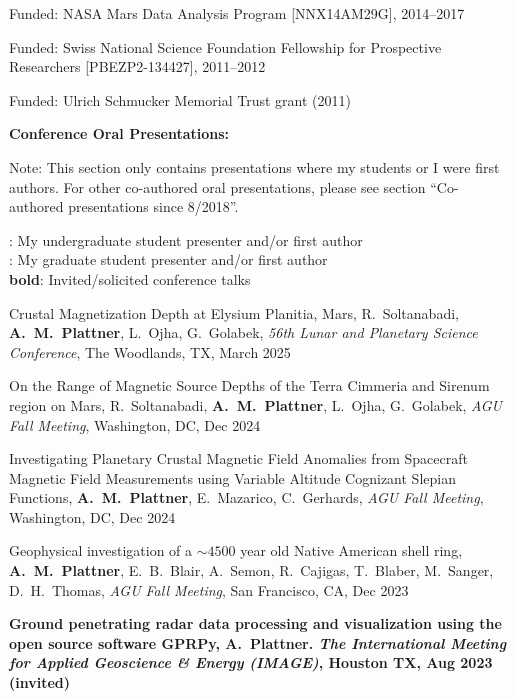 \documentclass[10pt]{article}
\begin{document}
 \spcp 
Funded: NASA Mars Data Analysis Program [NNX14AM29G], 2014--2017

\spcp Funded: Swiss National Science Foundation Fellowship for Prospective Researchers
[PBEZP2-134427], 2011--2012

\spcp
Funded: Ulrich Schmucker Memorial Trust grant (2011)


\spc
\textbf{\tsize Conference Oral Presentations:}

\vspace{0.2cm}
Note: This section only contains presentations where my students or I were first authors. For other co-authored oral presentations, please see section ``Co-authored presentations since 8/2018''.

\spcp
\ug: My undergraduate student presenter and/or first author\\
\gr: My graduate student presenter and/or first author\\
\textbf{bold}: Invited/solicited conference talks

\spcp
\hspace{-0.4cm} \gr \hspace{-0.03cm} Crustal Magnetization
Depth at Elysium Planitia, Mars, R.\ Soltanabadi, \textbf{A.~M.~Plattner},
L.\ Ojha, G.\ Golabek, \emph{56th Lunar and Planetary Science Conference},
The Woodlands, TX, March 2025

\spcp
\hspace{-0.4cm} \gr \hspace{-0.03cm} On the Range of Magnetic Source Depths of the Terra Cimmeria
and Sirenum region on Mars, R.\ Soltanabadi, \textbf{A.~M.~Plattner},
L.\ Ojha, G.\ Golabek,  \emph{AGU Fall Meeting}, Washington, DC, Dec 2024

\spcp
Investigating Planetary Crustal Magnetic Field Anomalies from
Spacecraft Magnetic Field Measurements using Variable Altitude
Cognizant Slepian Functions, \textbf{A.~M.~Plattner}, E.\ Mazarico,
C.\ Gerhards, \emph{AGU Fall Meeting}, Washington, DC, Dec 2024

\spcp
Geophysical investigation of a $\sim4500$ year old Native American shell ring, \textbf{A.~M.~Plattner}, E.~B.~Blair, A.~Semon, R.~Cajigas, T.~Blaber, M.~Sanger, D.~H.~Thomas,  \emph{AGU Fall Meeting}, San Francisco, CA, Dec 2023

\spcp
\textbf{Ground penetrating radar data processing and visualization using the open source software GPRPy, A.~Plattner. \emph{The International Meeting for
Applied Geoscience \& Energy (IMAGE)}, Houston TX, Aug 2023 (invited)}
\end{document}
